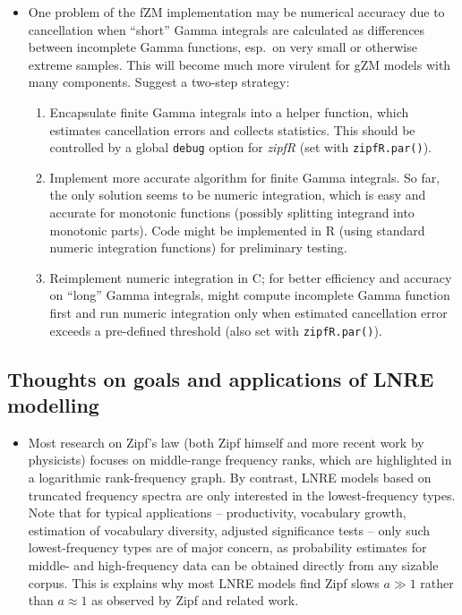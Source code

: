 \documentclass[a4paper]{article}
\begin{document}
\begin{itemize}
\item One problem of the fZM implementation may be numerical accuracy due to cancellation when ``short'' Gamma integrals are calculated as differences between incomplete Gamma functions, esp.\ on very small or otherwise extreme samples.  This will become much more virulent for gZM models with many components.  Suggest a two-step strategy:
  \begin{enumerate}
  \item Encapsulate finite Gamma integrals into a helper function, which estimates cancellation errors and collects statistics.  This should be controlled by a global \texttt{debug} option for \emph{zipfR} (set with \texttt{zipfR.par()}).
  \item Implement more accurate algorithm for finite Gamma integrals.  So far, the only solution seems to be numeric integration, which is easy and accurate for monotonic functions (possibly splitting integrand into monotonic parts).  Code might be implemented in R (using standard numeric integration functions) for preliminary testing.
  \item Reimplement numeric integration in C; for better efficiency and accuracy on ``long'' Gamma integrals, might compute incomplete Gamma function first and run numeric integration only when estimated cancellation error exceeds a pre-defined threshold (also set with \texttt{zipfR.par()}).
  \end{enumerate}

\end{itemize}


\subsection{Thoughts on goals and applications of LNRE modelling}
\label{sec:notes:goals-applications}

\begin{itemize}

\item Most research on Zipf's law (both Zipf himself and more recent work by physicists) focuses on middle-range frequency ranks, which are highlighted in a logarithmic rank-frequency graph.  By contrast, LNRE models \citep{Khmaladze:87,Baayen:01} based on truncated frequency spectra are only interested in the lowest-frequency types.  Note that for typical applications -- productivity, vocabulary growth, estimation of vocabulary diversity, adjusted significance tests -- only such lowest-frequency types are of major concern, as probability estimates for middle- and high-frequency data can be obtained directly from any sizable corpus.  This is explains why most LNRE models find Zipf slows $a \gg 1$ rather than $a\approx 1$ as observed by Zipf and related work.

\end{itemize}


  

\newpage
\listoftodos
\end{document}
